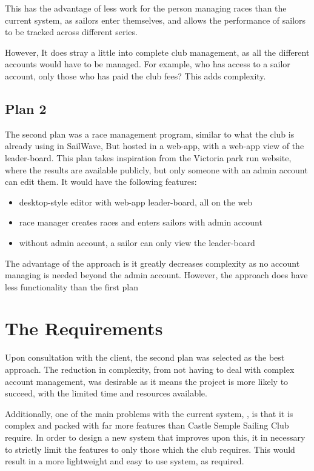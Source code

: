 \documentclass{l4proj}
\begin{document}
This has the advantage of less work for the person managing races than the current system, as sailors enter themselves, and allows the performance of sailors to be tracked across different series.

However, It does stray a little into complete club management, as all the different accounts would have to be managed. For example, who has access to a sailor account, only those who has paid the club fees? This adds complexity.

\subsection{Plan 2}
The second plan was a race management program, similar to what the club is already using in SailWave, But hosted in a web-app, with a web-app view of the leader-board. This plan takes inspiration from the Victoria park run website, \citep{Parkrun} where the results are available publicly, but only someone with an admin account can edit them. It would have the following features:
\begin{itemize}
    \item
    desktop-style editor with web-app leader-board, all on the web
    \item
    race manager creates races and enters sailors with admin account
    \item
    without admin account, a sailor can only view the leader-board
\end{itemize}

The advantage of the approach is it greatly decreases complexity as no account managing is needed beyond the admin account. However, the approach does have less functionality than the first plan

\section{The Requirements}
Upon consultation with the client, the second plan was selected as the best approach. The reduction in complexity, from not having to deal with complex account management, was desirable as it means the project is more likely to succeed, with the limited time and
resources available.

Additionally, one of the main problems with the current system, \citep{sailwave}, is that it is complex and packed with far more features than Castle Semple Sailing Club require. In order to design a new system that improves upon this, it in necessary to strictly limit the features to only those which the club requires. This would result in a more lightweight and easy to use system, as required.
\end{document}
